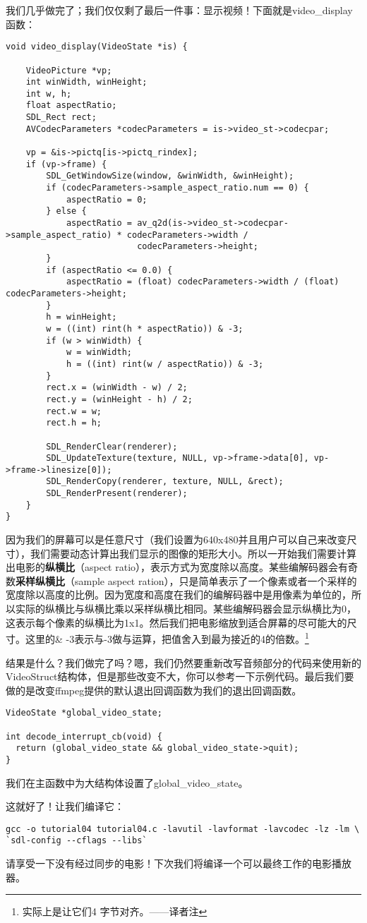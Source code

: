 我们几乎做完了；我们仅仅剩了最后一件事：显示视频！下面就是video_display函数：
\begin{lstlisting}
void video_display(VideoState *is) {

    VideoPicture *vp;
    int winWidth, winHeight;
    int w, h;
    float aspectRatio;
    SDL_Rect rect;
    AVCodecParameters *codecParameters = is->video_st->codecpar;

    vp = &is->pictq[is->pictq_rindex];
    if (vp->frame) {
        SDL_GetWindowSize(window, &winWidth, &winHeight);
        if (codecParameters->sample_aspect_ratio.num == 0) {
            aspectRatio = 0;
        } else {
            aspectRatio = av_q2d(is->video_st->codecpar->sample_aspect_ratio) * codecParameters->width /
                          codecParameters->height;
        }
        if (aspectRatio <= 0.0) {
            aspectRatio = (float) codecParameters->width / (float) codecParameters->height;
        }
        h = winHeight;
        w = ((int) rint(h * aspectRatio)) & -3;
        if (w > winWidth) {
            w = winWidth;
            h = ((int) rint(w / aspectRatio)) & -3;
        }
        rect.x = (winWidth - w) / 2;
        rect.y = (winHeight - h) / 2;
        rect.w = w;
        rect.h = h;

        SDL_RenderClear(renderer);
        SDL_UpdateTexture(texture, NULL, vp->frame->data[0], vp->frame->linesize[0]);
        SDL_RenderCopy(renderer, texture, NULL, &rect);
        SDL_RenderPresent(renderer);
    }
}
\end{lstlisting}

因为我们的屏幕可以是任意尺寸（我们设置为640x480并且用户可以自己来改变尺寸），我们需要动态计算出我们显示的图像的矩形大小。所以一开始我们需要计算出电影的\textbf{纵横比}（aspect ratio），表示方式为宽度除以高度。某些编解码器会有奇数\textbf{采样纵横比}（sample aspect ration），只是简单表示了一个像素或者一个采样的宽度除以高度的比例。因为宽度和高度在我们的编解码器中是用像素为单位的，所以实际的纵横比与纵横比乘以采样纵横比相同。某些编解码器会显示纵横比为0，这表示每个像素的纵横比为1x1。然后我们把电影缩放到适合屏幕的尽可能大的尺寸。这里的\& -3表示与-3做与运算，把值舍入到最为接近的4的倍数。\footnote{ 实际上是让它们4 字节对齐。——译者注}

结果是什么？我们做完了吗？嗯，我们仍然要重新改写音频部分的代码来使用新的VideoStruct结构体，但是那些改变不大，你可以参考一下示例代码。最后我们要做的是改变ffmpeg提供的默认退出回调函数为我们的退出回调函数。

\begin{lstlisting}
VideoState *global_video_state;

int decode_interrupt_cb(void) {
  return (global_video_state && global_video_state->quit);
}
\end{lstlisting}

我们在主函数中为大结构体设置了global_video_state。

这就好了！让我们编译它：
\begin{lstlisting}
gcc -o tutorial04 tutorial04.c -lavutil -lavformat -lavcodec -lz -lm \
`sdl-config --cflags --libs`
\end{lstlisting}

请享受一下没有经过同步的电影！下次我们将编译一个可以最终工作的电影播放器。

